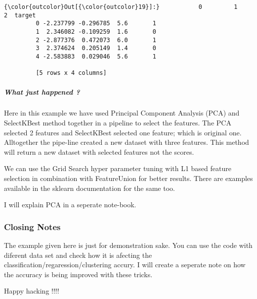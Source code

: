 \documentclass{article}
\begin{document}
            \begin{Verbatim}[commandchars=\\\{\}]
{\color{outcolor}Out[{\color{outcolor}19}]:}           0         1    2  target
         0 -2.237799 -0.296785  5.6       1
         1  2.346082 -0.109259  1.6       0
         2 -2.877376  0.472073  6.0       1
         3  2.374624  0.205149  1.4       0
         4 -2.583883  0.029046  5.6       1
         
         [5 rows x 4 columns]
\end{Verbatim}
        
    \subparagraph{What just happened ?}

Here in this example we have used Principal Component Analysis (PCA) and
SelectKBest method together in a pipeline to select the features. The
PCA selected 2 features and SelectKBest selected one feature; which is
original one. Alltogether the pipe-line created a new dataset with three
features. This method will return a new dataset with selected features
not the scores.

We can use the Grid Search hyper parameter tuning with L1 based feature
selection in combination with FeatureUnion for better results. There are
examples available in the sklearn documentation for the same too.

I will explain PCA in a seperate note-book.

\subsubsection{Closing Notes}

The example given here is just for demonstration sake. You can use the
code with diferent data set and check how it is afecting the
classification/regaression/clustering accury. I will create a seperate
note on how the accuracy is being improved with these tricks.

Happy hacking !!!!


    
    
    
    
\end{document}

